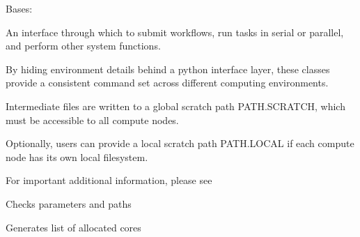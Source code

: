\documentclass[letterpaper,10pt,english]{sphinxmanual}
\begin{document}
\begin{fulllineitems}
\label{\detokenize{ref/seisflows.system:seisflows.system.slurm_sm.slurm_sm}}
Bases: {\hyperref[\detokenize{ref/seisflows.system:seisflows.system.base.base}]{}}

An interface through which to submit workflows, run tasks in serial or
parallel, and perform other system functions.

By hiding environment details behind a python interface layer, these
classes provide a consistent command set across different computing
environments.

Intermediate files are written to a global scratch path PATH.SCRATCH,
which must be accessible to all compute nodes.

Optionally, users can provide a local scratch path PATH.LOCAL if each
compute node has its own local filesystem.

For important additional information, please see

\begin{fulllineitems}
\label{\detokenize{ref/seisflows.system:seisflows.system.slurm_sm.slurm_sm.check}}
Checks parameters and paths

\end{fulllineitems}


\begin{fulllineitems}
\label{\detokenize{ref/seisflows.system:seisflows.system.slurm_sm.slurm_sm.hostlist}}
Generates list of allocated cores

\end{fulllineitems}



\end{fulllineitems}
\end{document}
